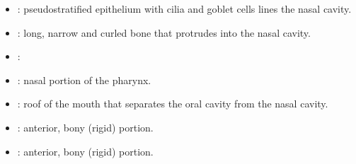 \begin{multicols}{2}
\begin{itemize}
  \item {}: pseudostratified epithelium with cilia and goblet cells lines the nasal cavity.
  
  \begin{center}
  \end{center}
  
  \item {}:  long, narrow and curled bone that protrudes into the nasal cavity.
  
  \begin{center}
  \end{center}
  
  \item {}: 
  
  \begin{center}
  \end{center}
  
  \item {}: nasal portion of the pharynx.
  
  \begin{center}
  \end{center}
  
  \item {}: roof of the mouth that separates the oral cavity from the nasal cavity. 
  
  \begin{center}
  \end{center}
  
  \item {}: anterior, bony (rigid) portion.
  
  \begin{center}
  \end{center}

  \item {}: anterior, bony (rigid) portion.
  
  \begin{center}
  \end{center}
  

\end{itemize}
\end{multicols}
